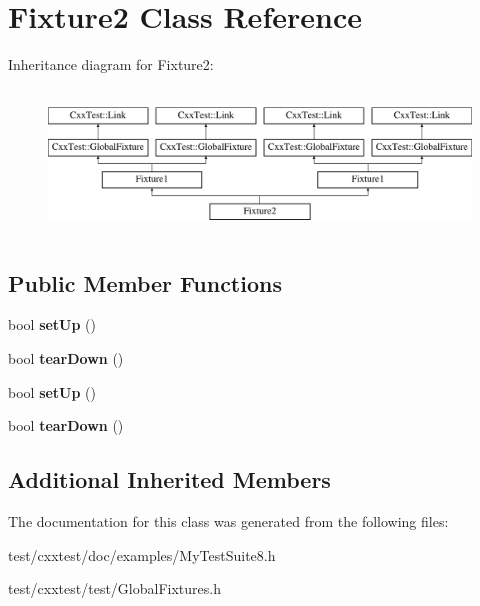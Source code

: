 \hypertarget{classFixture2}{\section{Fixture2 Class Reference}
\label{classFixture2}
}
Inheritance diagram for Fixture2\-:\begin{figure}[H]
\begin{center}
\leavevmode
\includegraphics[height=3.862069cm]{classFixture2}
\end{center}
\end{figure}
\subsection*{Public Member Functions}
\begin{DoxyCompactItemize}
\item 
\hypertarget{classFixture2_a7e49022158ef6fde84e8de248ccb376e}{bool {\bfseries set\-Up} ()}\label{classFixture2_a7e49022158ef6fde84e8de248ccb376e}

\item 
\hypertarget{classFixture2_ad3ba6f79ab507f3aa2d0832e72bbe461}{bool {\bfseries tear\-Down} ()}\label{classFixture2_ad3ba6f79ab507f3aa2d0832e72bbe461}

\item 
\hypertarget{classFixture2_a7e49022158ef6fde84e8de248ccb376e}{bool {\bfseries set\-Up} ()}\label{classFixture2_a7e49022158ef6fde84e8de248ccb376e}

\item 
\hypertarget{classFixture2_ad3ba6f79ab507f3aa2d0832e72bbe461}{bool {\bfseries tear\-Down} ()}\label{classFixture2_ad3ba6f79ab507f3aa2d0832e72bbe461}

\end{DoxyCompactItemize}
\subsection*{Additional Inherited Members}


The documentation for this class was generated from the following files\-:\begin{DoxyCompactItemize}
\item 
test/cxxtest/doc/examples/My\-Test\-Suite8.\-h\item 
test/cxxtest/test/Global\-Fixtures.\-h\end{DoxyCompactItemize}
